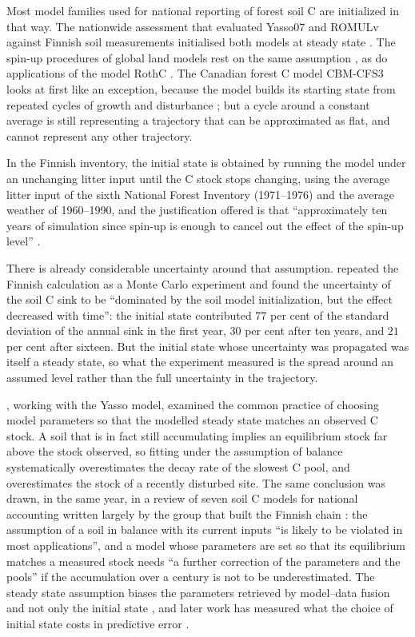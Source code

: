 \documentclass[11pt]{article}
\begin{document}
Most model families used for national reporting of forest soil C are initialized in that way. The
nationwide assessment that evaluated Yasso07 and ROMULv against Finnish soil measurements
initialised both models at steady state \citep{Lehtonen2016}. The spin-up
procedures of global land models rest on the same assumption \citep{Luo2016}, as do
applications of the model RothC \citep{ColemanJenkinson1996,Contreras2026}. The Canadian
forest C model CBM-CFS3 looks at first like an exception, because the model builds its
starting state from repeated cycles of growth and disturbance \citep{Kurz2009}; but a cycle around a constant average is still representing a trajectory that can be approximated as flat, and cannot represent any other trajectory.

In the Finnish inventory, the initial state is obtained by running the model under an unchanging litter
input until the C stock stops changing, using the average litter input of the sixth
National Forest Inventory (1971--1976) and the average weather of 1960--1990, and the
justification offered is that ``approximately ten years of simulation since spin-up is
enough to cancel out the effect of the spin-up level''
\citep[\S6.4, citing][]{StatFin2024NID,Peltoniemi2006}.

There is already considerable uncertainty around that assumption. \citet{Peltoniemi2006} repeated the Finnish calculation as a Monte Carlo
experiment and found the uncertainty of the soil C sink to be ``dominated by the soil
model initialization, but the effect decreased with time'': the initial state contributed
$77$ per cent of the standard deviation of the annual sink in the first year, $30$ per
cent after ten years, and $21$ per cent after sixteen. 
But the initial state whose uncertainty was propagated was itself a steady state, so what the experiment measured is the spread
around an assumed level rather than the full uncertainty in the trajectory.

\citet{Wutzler2007}, working
with the Yasso model, examined the common practice of choosing model parameters so that
the modelled steady state matches an observed C stock. A soil that is in fact still
accumulating implies an equilibrium stock far above the stock observed, so fitting under
the assumption of balance systematically overestimates the decay rate of the slowest C
pool, and overestimates the stock of a recently disturbed site. The same conclusion was
drawn, in the same year, in a review of seven soil C models for national accounting written
largely by the group that built the Finnish chain \citep{Peltoniemi2007}: the assumption of a
soil in balance with its current inputs ``is likely to be violated in most applications'', and
a model whose parameters are set so that its equilibrium matches a measured stock needs ``a
further correction of the parameters and the pools'' if the accumulation over a century is not
to be underestimated.
The steady state assumption biases the parameters retrieved by model--data fusion and not only
the initial state \citep{Carvalhais2008}, and later work has measured what the choice of
initial state costs in predictive error \citep{Lee2020,Kanari2022}.
\end{document}

